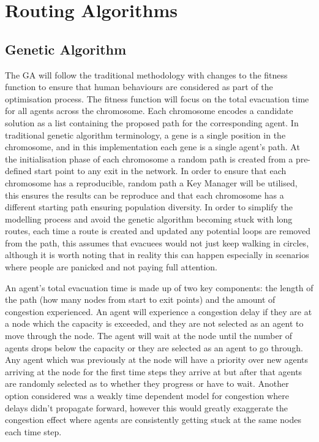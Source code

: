 \documentclass[12pt,a4paper]{report}
\begin{document}
\section{Routing Algorithms}
\subsection{Genetic Algorithm}
The GA will follow the traditional methodology with changes to the fitness function to ensure that human behaviours are considered as part of the optimisation process. 
The fitness function will focus on the total evacuation time for all agents across the chromosome. Each chromosome encodes a candidate solution as a list containing the proposed path for the corresponding agent. In traditional genetic algorithm terminology, a gene is a single position in the chromosome, and in this implementation each gene is a single agent’s path. At the initialisation phase of each chromosome a random path is created from a pre-defined start point to any exit in the network. In order to ensure that each chromosome has a reproducible, random path a Key Manager will be utilised, this ensures the results can be reproduce and that each chromosome has a different starting path ensuring population diversity. In order to simplify the modelling process and avoid the genetic algorithm becoming stuck with long routes, each time a route is created and updated any potential loops are removed from the path, this assumes that evacuees would not just keep walking in circles, although it is worth noting that in reality this can happen especially in scenarios where people are panicked and not paying full attention.

An agent’s total evacuation time is made up of two key components: the length of the path (how many nodes from start to exit points) and the amount of congestion experienced. An agent will experience a congestion delay if they are at a node which the capacity is exceeded, and they are not selected as an agent to move through the node. The agent will wait at the node until the number of agents drops below the capacity or they are selected as an agent to go through. Any agent which was previously at the node will have a priority over new agents arriving at the node for the first time steps they arrive at but after that agents are randomly selected as to whether they progress or have to wait. Another option considered was a weakly time dependent model for congestion where delays didn’t propagate forward, however this would greatly exaggerate the congestion effect where agents are consistently getting stuck at the same nodes each time step. 
\end{document}
